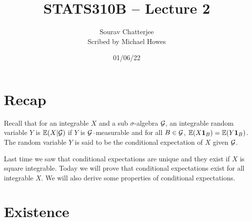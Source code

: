 




\title{STATS310B -- Lecture 2}
\author{Sourav Chatterjee\\ Scribed by Michael Howes}
\date{01/06/22}

\pagestyle{fancy}
\fancyhf{}


\maketitle
\tableofcontents
\section{Recap}
Recall that for an integrable $X$ and a sub $\sigma$-algebra ${\mathcal{G}}$, an integrable random variable $Y$ is ${\mathbb{E}}(X|{\mathcal{G}})$ if $Y$ is ${\mathcal{G}}$--measurable and for all $B \in {\mathcal{G}}$, ${\mathbb{E}}(X{{\bf 1}}_B) = {\mathbb{E}}(Y{{\bf 1}}_B)$. The random variable $Y$ is said to be the conditional expectation of $X$ given ${\mathcal{G}}$.

Last time we saw that conditional expectations are unique and they exist if $X$ is square integrable. Today we will prove that conditional expectations exist for all integrable $X$. We will also derive some properties of conditional expectations.
\section{Existence}

